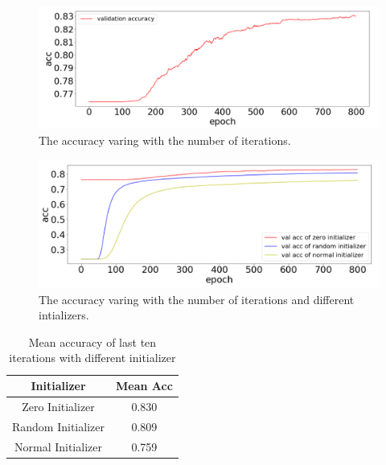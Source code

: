 \documentclass[journal, a4paper]{IEEEtran}
\begin{document}
	\begin{figure}[!hbt]
		\begin{center}
		\includegraphics[width=\columnwidth]{lr1}
		\caption{The accuracy varing with the number of iterations.}
		\label{fig:lr1}
		\end{center}
	\end{figure}

	\begin{figure}[!hbt]
		\begin{center}
		\includegraphics[width=\columnwidth]{lr2}
		\caption{The accuracy varing with the number of iterations and different intializers.}
		\label{fig:lr2}
		\end{center}
	\end{figure}
	
	\begin{table}[!hbt]
		\begin{center}
		\caption{Mean accuracy of last ten iterations with different initializer}
		\label{tab:lossInitial}
		\begin{tabular}{|c|c|}
			\hline
			Initializer & Mean Acc \\
			\hline
			Zero Initializer & 0.830 \\
			\hline
			Random Initializer & 0.809 \\
			\hline
			Normal Initializer & 0.759 \\
			\hline
		\end{tabular}
		\end{center}
	\end{table}
\end{document}
